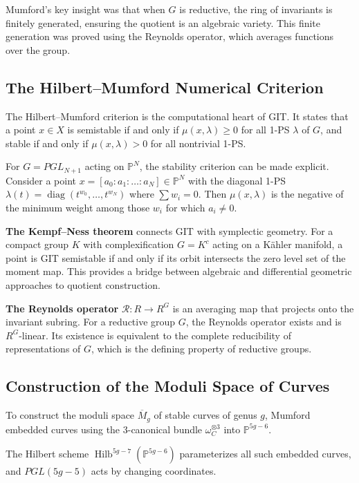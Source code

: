 Mumford's key insight was that when $G$ is reductive, the ring of invariants is finitely generated, ensuring the quotient is an algebraic variety. This finite generation was proved using the Reynolds operator, which averages functions over the group.

\subsection{The Hilbert--Mumford Numerical Criterion}

The Hilbert--Mumford criterion is the computational heart of GIT. It states that a point $x \in X$ is semistable if and only if $\mu(x, \lambda) \geq 0$ for all 1-PS $\lambda$ of $G$, and stable if and only if $\mu(x, \lambda) > 0$ for all nontrivial 1-PS.

For $G = PGL_{N+1}$ acting on $\mathbb{P}^N$, the stability criterion can be made explicit. Consider a point $x = [a_0 : a_1 : \ldots : a_N] \in \mathbb{P}^N$ with the diagonal 1-PS $\lambda(t) = \operatorname{diag}(t^{w_0}, \ldots, t^{w_N})$ where $\sum w_i = 0$. Then $\mu(x, \lambda)$ is the negative of the minimum weight among those $w_i$ for which $a_i \neq 0$.

\textbf{The Kempf--Ness theorem} connects GIT with symplectic geometry. For a compact group $K$ with complexification $G = K^c$ acting on a Kähler manifold, a point is GIT semistable if and only if its orbit intersects the zero level set of the moment map. This provides a bridge between algebraic and differential geometric approaches to quotient construction.

\textbf{The Reynolds operator} $\mathcal{R}: R \to R^G$ is an averaging map that projects onto the invariant subring. For a reductive group $G$, the Reynolds operator exists and is $R^G$-linear. Its existence is equivalent to the complete reducibility of representations of $G$, which is the defining property of reductive groups.

\subsection{Construction of the Moduli Space of Curves}

To construct the moduli space $\overline{M}_g$ of stable curves of genus $g$, Mumford embedded curves using the 3-canonical bundle $\omega_C^{\otimes 3}$ into $\mathbb{P}^{5g-6}$.

The Hilbert scheme $\operatorname{Hilb}^{5g-7}(\mathbb{P}^{5g-6})$ parameterizes all such embedded curves, and $PGL(5g-5)$ acts by changing coordinates.

